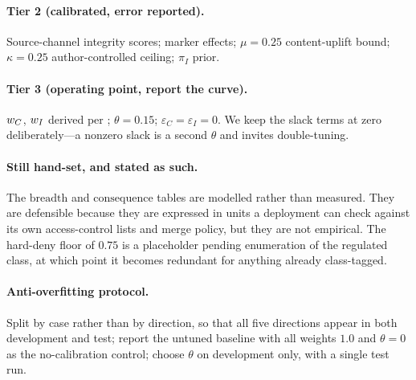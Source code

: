 \paragraph{Tier 2 (calibrated, error reported).} Source-channel integrity
scores; marker effects; $\mu = 0.25$ content-uplift bound; $\kappa = 0.25$
author-controlled ceiling; $\pi_I$ prior. 

\paragraph{Tier 3 (operating point, report the curve).} $w_C$, $w_I$ derived
per ; $\theta = 0.15$; $\varepsilon_C = \varepsilon_I = 0$.
We keep the slack terms at zero deliberately---a nonzero slack is a second
$\theta$ and invites double-tuning. 

\paragraph{Still hand-set, and stated as such.} The $\mathrm{breadth}$ and
$\mathrm{consequence}$ tables are modelled rather than measured. They are
defensible because they are expressed in units a deployment can check against
its own access-control lists and merge policy, but they are not empirical.
The hard-deny floor of $0.75$ is a placeholder pending enumeration of the
regulated class, at which point it becomes redundant for anything already
class-tagged.

\paragraph{Anti-overfitting protocol.} Split by case rather than by direction,
so that all five directions appear in both development and test; report the
untuned baseline with all weights $1.0$ and $\theta = 0$ as the no-calibration
control; choose $\theta$ on development only, with a single test run.
